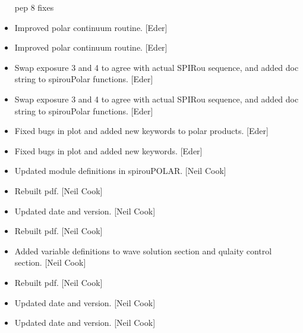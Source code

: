 \documentclass[a4paper,10pt,english]{report}
\begin{document}
\begin{itemize}
pep 8 fixes

\item {} 
Improved polar continuum routine. {[}Eder{]}

\item {} 
Improved polar continuum routine. {[}Eder{]}

\item {} 
Swap exposure 3 and 4 to agree with actual SPIRou sequence, and added
doc string to spirouPolar functions. {[}Eder{]}

\item {} 
Swap exposure 3 and 4 to agree with actual SPIRou sequence, and added
doc string to spirouPolar functions. {[}Eder{]}

\item {} 
Fixed bugs in plot and added new keywords to polar products. {[}Eder{]}

\item {} 
Fixed bugs in plot and added new keywords. {[}Eder{]}

\item {} 
Updated module definitions in spirouPOLAR. {[}Neil Cook{]}

\item {} 
Rebuilt pdf. {[}Neil Cook{]}

\item {} 
Updated date and version. {[}Neil Cook{]}

\item {} 
Rebuilt pdf. {[}Neil Cook{]}

\item {} 
Added variable definitions to wave solution section and qulaity
control section. {[}Neil Cook{]}

\item {} 
Rebuilt pdf. {[}Neil Cook{]}

\item {} 
Updated date and version. {[}Neil Cook{]}

\item {} 
Updated date and version. {[}Neil Cook{]}

\end{itemize}
\end{document}
